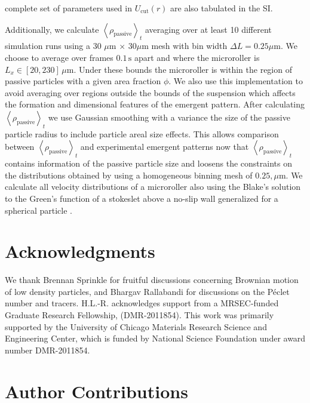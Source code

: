 \documentclass[12pt]{article}
\begin{document}
complete set of parameters used in $U_\mathrm{cut} \left (r \right)$ are also tabulated in the SI.

Additionally, we calculate $\left < \rho_\mathrm{passive} \right >_t$ averaging over at least 10 different simulation runs using a 30 $\mu \mathrm{m} \, \times \, 30  \mu \mathrm{m}$ mesh with bin width $\Delta L = 0.25 \mu \mathrm{m}$. We choose to average over frames $0.1 \, \mathrm{s}$ apart and where the microroller is $L_x \in [20,230] \, \mu \mathrm{m}$. Under these bounds the microroller is within the region of passive particles with a given area fraction $\phi$. We also use this implementation to avoid averaging over regions outside the bounds of the suspension which affects the formation and dimensional features of the emergent pattern. After calculating $\left < \rho_\mathrm{passive} \right >_t$ we use Gaussian smoothing with a variance the size of the passive particle radius to include particle areal size effects. This allows comparison between $\left < \rho_\mathrm{passive} \right >_t$ and experimental emergent patterns now that $\left < \rho_\mathrm{passive} \right >_t$ contains information of the passive particle size and loosens the constraints on the distributions obtained by using a homogeneous binning mesh of $0.25, \mu \mathrm{m}$. We calculate all velocity distributions of a microroller also using the Blake's solution to the Green's function of a stokeslet above a no-slip wall generalized for a spherical particle \cite{Swan_no_slip}.

\section*{Acknowledgments}
We thank Brennan Sprinkle for fruitful discussions concerning Brownian motion of low density particles, and Bhargav Rallabandi for discussions on the P\'eclet number and tracers. H.L.-R. acknowledges support from a MRSEC-funded Graduate Research Fellowship, (DMR-2011854). This work was primarily supported by the University of Chicago Materials Research Science and Engineering Center, which is funded by National Science Foundation under award number DMR-2011854.

\section*{Author Contributions}
\end{document}
